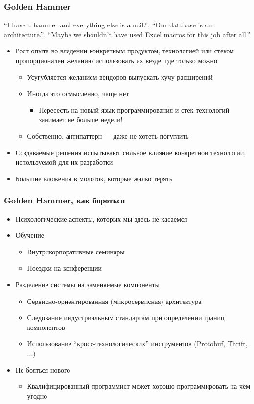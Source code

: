 \documentclass[xetex,mathserif,serif]{beamer}
\begin{document}
	\begin{frame}
		\frametitle{Golden Hammer}
		``I have a hammer and everything else is a nail.'', ``Our database is our architecture.'', ``Maybe we shouldn’t have used Excel macros for this job after all.''
		\begin{itemize}
			\item Рост опыта во владении конкретным продуктом, технологией или стеком пропорционален желанию использовать их везде, где только можно
			\begin{itemize}
				\item Усугубляется желанием вендоров выпускать кучу расширений
				\item Иногда это осмысленно, чаще нет
				\begin{itemize}
					\item Пересесть на новый язык программирования и стек технологий занимает не больше недели!
				\end{itemize}
				\item Собственно, антипаттерн --- даже не хотеть погуглить
			\end{itemize}
			\item Создаваемые решения испытывают сильное влияние конкретной технологии, используемой для их разработки
			\item Большие вложения в молоток, которые жалко терять
		\end{itemize}
	\end{frame}

	\begin{frame}
		\frametitle{Golden Hammer, как бороться}
		\begin{itemize}
			\item Психологические аспекты, которых мы здесь не касаемся
			\item Обучение
			\begin{itemize}
				\item Внутрикорпоративные семинары
				\item Поездки на конференции
			\end{itemize}
			\item Разделение системы на заменяемые компоненты
			\begin{itemize}
				\item Сервисно-ориентированная (микросервисная) архитектура
				\item Следование индустриальным стандартам при определении границ компонентов
				\item Использование ``кросс-технологических'' инструментов (Protobuf, Thrift, ...)
			\end{itemize}
			\item Не бояться нового
			\begin{itemize}
				\item Квалифицированный программист может хорошо программировать на чём угодно
			\end{itemize}
		\end{itemize}
	\end{frame}
\end{document}

